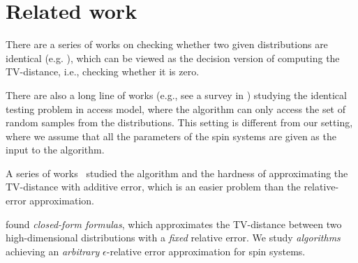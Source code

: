 \section{Related work}
There are a series of works on checking whether two given distributions are identical (e.g. \cite{CortesMR07,DoyenHR08,KieferMOWW11,BGMMPV24ICLR}), which can be viewed as the decision version of computing the TV-distance, i.e., checking whether it is zero. 



There are also a long line of works (e.g., see a survey in \cite{Canonne15}) studying the identical testing problem in access model, where the algorithm can only access the set of random samples from the distributions.
This setting is different from our setting, where we assume that all the parameters of the spin systems are given as the input to the algorithm.


A series of works~\cite{0001GMV20,ChenK14,Kiefer18,CanonneR14} studied the algorithm and the hardness of approximating the TV-distance with additive error, which is an easier problem than the relative-error approximation.


\cite{devroye2018total,ArbasAL23,kontorovich2024tensorization,kontorovich2024sharp} found \emph{closed-form formulas}, which approximates the TV-distance between two high-dimensional distributions with a \emph{fixed} relative error.
We study \emph{algorithms} achieving an \emph{arbitrary} $\epsilon$-relative error approximation for spin systems.


%